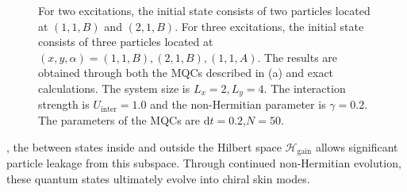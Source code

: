 \documentclass[longbibliography, aps, prx, amsmath, amssymb, amsfonts, twocolumn,superscriptaddress, footinbib]{revtex4-1}
\begin{document}
\begin{figure}[htbp]
{		%
		For two excitations, the initial state consists of two particles located at $(1,1,B)$ and $(2,1,B)$. For three excitations, the initial state consists of three particles located at $(x,y,\alpha)=(1,1,B), (2,1,B), (1,1,A)$.
		The results are obtained through both the MQCs described in (a) and exact calculations. The system size is $L_x=2,L_y=4$. The interaction strength is $U_{\text{inter}}=1.0$ and the non-Hermitian parameter is $\gamma=0.2$. The parameters of the MQCs are $\mathrm{d}t=0.2$,$N=50$.
		}
		\label{fig:04}
	\end{figure}
    
    {\color{blue}{If no many-body interaction exists}}, the {\color{blue}{energy degeneracy}} between states inside and outside the Hilbert space $\mathscr{H}_{\text{gain}}$ allows significant particle leakage from this subspace.
	Through continued non-Hermitian evolution, these quantum states ultimately evolve into chiral skin modes.
\end{document}
